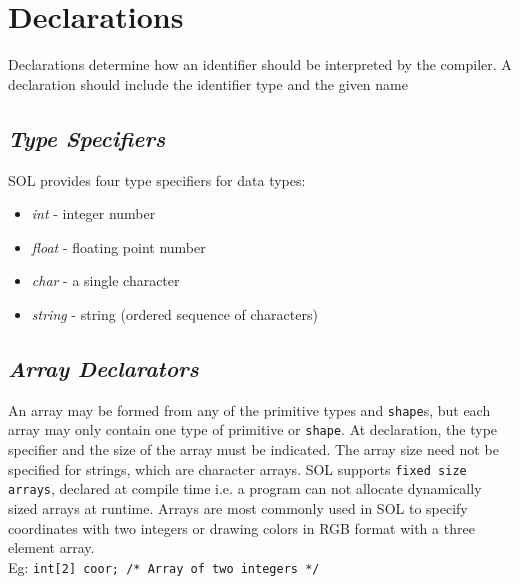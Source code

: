\documentclass[letterpaper,12pt]{article}
\begin{document}
\section{Declarations}

    Declarations determine how an identifier should be interpreted by the compiler. A declaration should include the identifier type and the given name

    \subsection{\textit{Type Specifiers}} \label{type}
    SOL provides four type specifiers for data types:
    \begin{itemize}
        \itemsep0em
        \item \textit{int} - integer number
        \item \textit{float} - floating point number
        \item \textit{char} - a single character
        \item \textit{string} - string (ordered sequence of characters)
    \end{itemize}

	\subsection{\textit{Array Declarators}} \label{array}
    An array may be formed from any of the primitive types and \texttt{shape}s, but each array may only contain one type of primitive or \texttt{shape}. At declaration, the type specifier and the size of the array must be indicated. The array size need not be specified for strings, which are character arrays. SOL supports \texttt{fixed size arrays}, declared at compile time i.e. a program can not allocate dynamically sized arrays at runtime. Arrays are most commonly used in SOL to specify coordinates with two integers or drawing colors in RGB format with a three element array.\\
    Eg: \texttt{int[2] coor; /* Array of two integers */}
\end{document}
